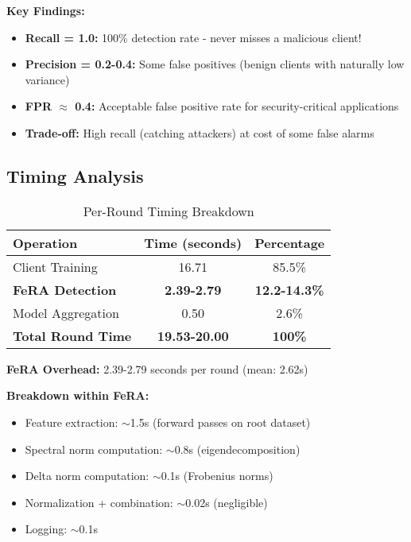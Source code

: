 \documentclass[11pt,a4paper]{article}
\begin{document}
\textbf{Key Findings:}
\begin{itemize}
    \item \textbf{Recall = 1.0:} 100\% detection rate - never misses a malicious client!
    \item \textbf{Precision = 0.2-0.4:} Some false positives (benign clients with naturally low variance)
    \item \textbf{FPR $\approx$ 0.4:} Acceptable false positive rate for security-critical applications
    \item \textbf{Trade-off:} High recall (catching attackers) at cost of some false alarms
\end{itemize}

\subsection{Timing Analysis}

\begin{table}[h]
\centering
\begin{tabular}{@{}lcc@{}}
\toprule
\textbf{Operation} & \textbf{Time (seconds)} & \textbf{Percentage} \\
\midrule
Client Training & 16.71 & 85.5\% \\
\textbf{FeRA Detection} & \textbf{2.39-2.79} & \textbf{12.2-14.3\%} \\
Model Aggregation & 0.50 & 2.6\% \\
\midrule
\textbf{Total Round Time} & \textbf{19.53-20.00} & \textbf{100\%} \\
\bottomrule
\end{tabular}
\caption{Per-Round Timing Breakdown}
\label{tab:timing}
\end{table}

\textbf{FeRA Overhead:} 2.39-2.79 seconds per round (mean: 2.62s)

\textbf{Breakdown within FeRA:}
\begin{itemize}
    \item Feature extraction: $\sim$1.5s (forward passes on root dataset)
    \item Spectral norm computation: $\sim$0.8s (eigendecomposition)
    \item Delta norm computation: $\sim$0.1s (Frobenius norms)
    \item Normalization + combination: $\sim$0.02s (negligible)
    \item Logging: $\sim$0.1s
\end{itemize}
\end{document}
